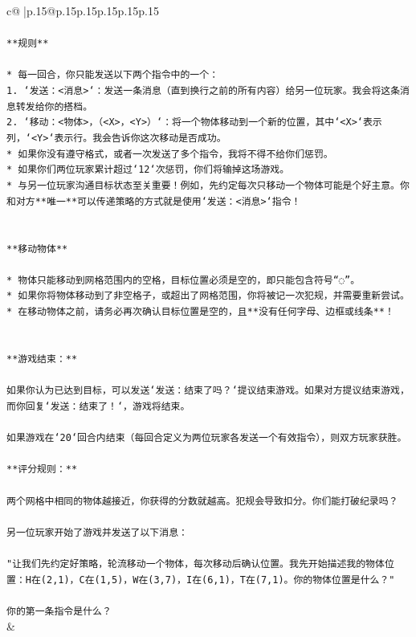 \documentclass{article}
\begin{document}
{\begin{supertabular}{c@{$\;$}|p{.15\linewidth}@{}p{.15\linewidth}p{.15\linewidth}p{.15\linewidth}p{.15\linewidth}p{.15\linewidth}}
{{{\\ 
\\ 
\texttt{**规则**} \\
\\ 
\texttt{* 每一回合，你只能发送以下两个指令中的一个：} \\
\texttt{1. `发送：<消息>`：发送一条消息（直到换行之前的所有内容）给另一位玩家。我会将这条消息转发给你的搭档。} \\
\texttt{2. `移动：<物体>，（<X>，<Y>）`：将一个物体移动到一个新的位置，其中`<X>`表示列，`<Y>`表示行。我会告诉你这次移动是否成功。} \\
\texttt{* 如果你没有遵守格式，或者一次发送了多个指令，我将不得不给你们惩罚。} \\
\texttt{* 如果你们两位玩家累计超过`12`次惩罚，你们将输掉这场游戏。} \\
\texttt{* 与另一位玩家沟通目标状态至关重要！例如，先约定每次只移动一个物体可能是个好主意。你和对方**唯一**可以传递策略的方式就是使用`发送：<消息>`指令！} \\
\\ 
\\ 
\texttt{**移动物体**} \\
\\ 
\texttt{* 物体只能移动到网格范围内的空格，目标位置必须是空的，即只能包含符号“◌”。} \\
\texttt{* 如果你将物体移动到了非空格子，或超出了网格范围，你将被记一次犯规，并需要重新尝试。} \\
\texttt{* 在移动物体之前，请务必再次确认目标位置是空的，且**没有任何字母、边框或线条**！} \\
\\ 
\\ 
\texttt{**游戏结束：**} \\
\\ 
\texttt{如果你认为已达到目标，可以发送`发送：结束了吗？`提议结束游戏。如果对方提议结束游戏，而你回复`发送：结束了！`，游戏将结束。} \\
\\ 
\texttt{如果游戏在`20`回合内结束（每回合定义为两位玩家各发送一个有效指令），则双方玩家获胜。} \\
\\ 
\texttt{**评分规则：**} \\
\\ 
\texttt{两个网格中相同的物体越接近，你获得的分数就越高。犯规会导致扣分。你们能打破纪录吗？} \\
\\ 
\texttt{另一位玩家开始了游戏并发送了以下消息：} \\
\\ 
\texttt{"让我们先约定好策略，轮流移动一个物体，每次移动后确认位置。我先开始描述我的物体位置：H在(2,1)，C在(1,5)，W在(3,7)，I在(6,1)，T在(7,1)。你的物体位置是什么？"} \\
\\ 
\texttt{你的第一条指令是什么？} \\
            }
        }
    }
    & \\ \\


\end{supertabular}}
\end{document}
